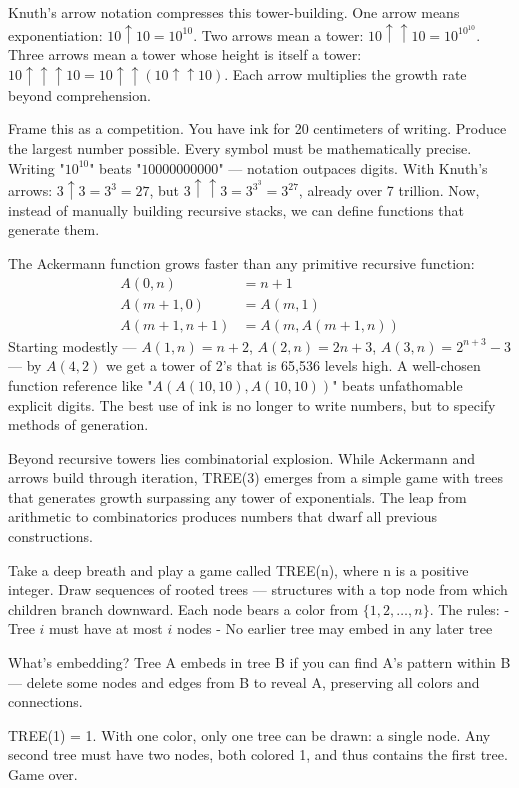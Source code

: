 Knuth's arrow notation compresses this tower-building. One arrow means exponentiation: $10 \uparrow 10 = 10^{10}$. Two arrows mean a tower: $10 \uparrow\uparrow 10 = 10^{10^{10}}$. Three arrows mean a tower whose height is itself a tower: $10 \uparrow\uparrow\uparrow 10 = 10 \uparrow\uparrow (10 \uparrow\uparrow 10)$. Each arrow multiplies the growth rate beyond comprehension.

Frame this as a competition. You have ink for 20 centimeters of writing. Produce the largest number possible. Every symbol must be mathematically precise. Writing "$10^{10}$" beats "$10000000000$" — notation outpaces digits. With Knuth's arrows: $3 \uparrow 3 = 3^3 = 27$, but $3 \uparrow\uparrow 3 = 3^{3^3} = 3^{27}$, already over 7 trillion. Now, instead of manually building recursive stacks, we can define functions that generate them.

The Ackermann function grows faster than any primitive recursive function:
\[
\begin{aligned}
A(0,n) &= n+1 \\
A(m+1,0) &= A(m,1) \\
A(m+1,n+1) &= A(m, A(m+1,n))
\end{aligned}
\]
Starting modestly — $A(1,n) = n+2$, $A(2,n) = 2n+3$, $A(3,n) = 2^{n+3} - 3$ — by $A(4,2)$ we get a tower of 2's that is 65,536 levels high. A well-chosen function reference like "$A(A(10,10),A(10,10))$" beats unfathomable explicit digits. The best use of ink is no longer to write numbers, but to specify methods of generation.

Beyond recursive towers lies combinatorial explosion. While Ackermann and arrows build through iteration, TREE(3) emerges from a simple game with trees that generates growth surpassing any tower of exponentials. The leap from arithmetic to combinatorics produces numbers that dwarf all previous constructions.

Take a deep breath and play a game called TREE(n), where n is a positive integer. Draw sequences of rooted trees — structures with a top node from which children branch downward. Each node bears a color from $\{1, 2, \ldots, n\}$. The rules:
- Tree $i$ must have at most $i$ nodes
- No earlier tree may embed in any later tree

What's embedding? Tree A embeds in tree B if you can find A's pattern within B — delete some nodes and edges from B to reveal A, preserving all colors and connections.

TREE(1) = 1. With one color, only one tree can be drawn: a single node. Any second tree must have two nodes, both colored 1, and thus contains the first tree. Game over.

